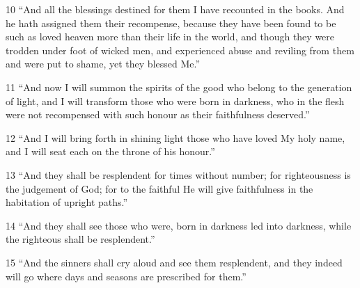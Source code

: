 \par 10 “And all the blessings destined for them I have recounted in the books. And he hath assigned them their recompense, because they have been found to be such as loved heaven more than their life in the world, and though they were trodden under foot of wicked men, and experienced abuse and reviling from them and were put to shame, yet they blessed Me.”
\par 11 “And now I will summon the spirits of the good who belong to the generation of light, and I will transform those who were born in darkness, who in the flesh were not recompensed with such honour as their faithfulness deserved.”
\par 12 “And I will bring forth in shining light those who have loved My holy name, and I will seat each on the throne of his honour.”
\par 13 “And they shall be resplendent for times without number; for righteousness is the judgement of God; for to the faithful He will give faithfulness in the habitation of upright paths.”
\par 14 “And they shall see those who were, born in darkness led into darkness, while the righteous shall be resplendent.”
\par 15 “And the sinners shall cry aloud and see them resplendent, and they indeed will go where days and seasons are prescribed for them.”

